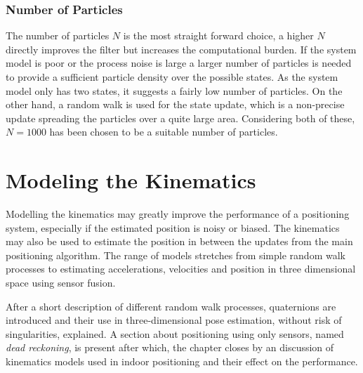 \documentclass{LTHthesis}
\begin{document}
\subsection{Number of Particles}
%
The number of particles $N$ is the most straight forward choice, a higher $N$ directly improves the filter but increases the computational burden. If the system model is poor or the process noise is large a larger number of particles is needed to provide a sufficient particle density over the possible states. As the system model only has two states, it suggests a fairly low number of particles. On the other hand, a random walk is used for the state update, which is a non-precise update spreading the particles over a quite large area. Considering both of these, $N=1000$ has been chosen to be a suitable number of particles.    
%
\chapter{Modeling the Kinematics} %
%
Modelling the kinematics may greatly improve the performance of a positioning system, especially if the estimated position is noisy or biased. The kinematics may also be used to estimate the position in between the updates from the main positioning algorithm. The range of models stretches from simple random walk processes to estimating accelerations, velocities and position in three dimensional space using sensor fusion.

After a short description of different random walk processes, quaternions are introduced and their use in three-dimensional pose  estimation, without risk of singularities, explained. A section about positioning using only sensors, named \emph{dead reckoning}, is present after which, the chapter closes by an discussion of kinematics models used in indoor positioning and their effect on the performance.   
%
\end{document}
